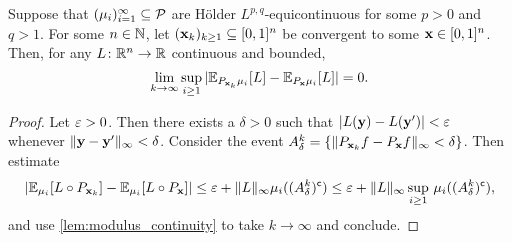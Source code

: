 \documentclass[12pt]{report}
\begin{document}
\begin{lemma} \label{lem:Holder_uniform_weak_convergence-fdds}
    Suppose that $(\mu_i)_{i=1}^\infty \subseteq \mathcal{P}$ are H\"older $L^{p,q}$-equicontinuous for some $p > 0$ and $q > 1$.
    For some $n \in \mathbb{N}$, let $(\mathbf{x}_k)_{k \ge 1} \subseteq [0, 1]^n$ be convergent to some $\mathbf{x} \in [0, 1]^n$.
    Then, for any $L\colon \mathbb{R}^n \to \mathbb{R}$ continuous and bounded,
    \begin{equation}
        \lim_{k \to \infty} \operatorname*{sup}_{i \ge 1}\, \lvert
            \mathbb{E}_{P_{\mathbf{x}_k} \mu_i}[L] - \mathbb{E}_{P_{\mathbf{x}} \mu_i}[L]
        \rvert
        = 0.
    \end{equation}
\end{lemma}
\begin{proof}
    Let $\varepsilon > 0$.
    Then there exists a $\delta > 0$ such that $\lvert L(\mathbf{y}) - L(\mathbf{y}')\rvert < \varepsilon$ whenever $\lVert\mathbf{y} - \mathbf{y}'\rVert_\infty < \delta$.
    Consider the event $A_\delta^k = \{\lVert P_{\mathbf{x}_k} f - P_{\mathbf{x}} f\rVert_\infty < \delta\}$.
    Then estimate
    \begin{equation}
        \abs{
            \E_{\mu_i}[L \comp P_{\vx_k}]
            - \E_{\mu_i}[L \comp P_{\vx}]
        }
        \le
            \e + \norm{L}_\infty \mu_i((A^k_\delta)^\c)
        \le
            \e + \norm{L}_\infty \sup_{i \ge 1}\, \mu_i((A^k_\delta)^\c),
    \end{equation}
    and use \cref{lem:modulus_continuity} to take $k \to \infty$ and conclude.
\end{proof}
\end{document}
